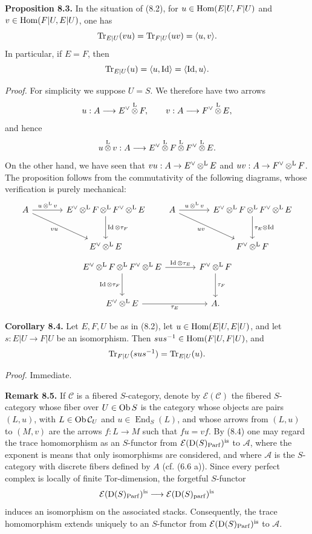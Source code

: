 \documentclass[11pt]{article}
\newcommand{\Parf}{\operatorname{Parf}}
\begin{document}
\textbf{Proposition 8.3.} In the situation of (8.2), for \(u\in\operatorname{Hom}(E|U,F|U)\) and \(v\in\operatorname{Hom}(F|U,E|U)\), one has
\[
  \operatorname{Tr}_{E|U}(vu)=\operatorname{Tr}_{F|U}(uv)=\langle u,v\rangle.
\]
In particular, if \(E=F\), then
\[
  \operatorname{Tr}_{E|U}(u)=\langle u,\operatorname{Id}\rangle=\langle\operatorname{Id},u\rangle.
\]

\emph{Proof.} For simplicity we suppose \(U=S\). We therefore have two arrows
\[
  u:A\longrightarrow E^\vee\mathop{\otimes}^{\mathrm L} F,
  \qquad
  v:A\longrightarrow F^\vee\mathop{\otimes}^{\mathrm L} E,
\]
and hence
\[
  u\mathop{\otimes}^{\mathrm L} v:A\longrightarrow E^\vee\mathop{\otimes}^{\mathrm L} F\mathop{\otimes}^{\mathrm L} F^\vee\mathop{\otimes}^{\mathrm L} E.
\]
On the other hand, we have seen that \(vu:A\to E^\vee\mathop{\otimes}^{\mathrm L} E\) and \(uv:A\to F^\vee\mathop{\otimes}^{\mathrm L} F\). The proposition follows from the commutativity of the following diagrams, whose verification is purely mechanical:
\[
\begin{tikzcd}[column sep=large,row sep=large]
 A \arrow[r,"u\otL v"] \arrow[dr,"vu"'] & E^\vee\otL F\otL F^\vee\otL E \arrow[d,"\Id\otimes\tau_F"] \\
 & E^\vee\otL E
\end{tikzcd}
\qquad
\begin{tikzcd}[column sep=large,row sep=large]
 A \arrow[r,"u\otL v"] \arrow[dr,"uv"'] & E^\vee\otL F\otL F^\vee\otL E \arrow[d,"\tau_E\otimes\Id"] \\
 & F^\vee\otL F
\end{tikzcd}
\]
\[
\begin{tikzcd}[column sep=large,row sep=large]
E^\vee\otL F\otL F^\vee\otL E \arrow[r,"\Id\otimes\tau_E"] \arrow[d,"\Id\otimes\tau_F"'] & F^\vee\otL F \arrow[d,"\tau_F"]\\
E^\vee\otL E \arrow[r,"\tau_E"'] & A .
\end{tikzcd}
\]

\textbf{Corollary 8.4.} Let \(E,F,U\) be as in (8.2), let \(u\in\operatorname{Hom}(E|U,E|U)\), and let \(s:E|U\to F|U\) be an isomorphism. Then \(sus^{-1}\in\operatorname{Hom}(F|U,F|U)\), and
\[
  \operatorname{Tr}_{F|U}(sus^{-1})=\operatorname{Tr}_{E|U}(u).
\]

\emph{Proof.} Immediate.

\textbf{Remark 8.5.} If \(\mathcal C\) is a fibered \(S\)-category, denote by \(\mathcal E(\mathcal C)\) the fibered \(S\)-category whose fiber over \(U\in\operatorname{Ob} S\) is the category whose objects are pairs \((L,u)\), with \(L\in\operatorname{Ob}\mathcal C_U\) and \(u\in\operatorname{End}_S(L)\), and whose arrows from \((L,u)\) to \((M,v)\) are the arrows \(f:L\to M\) such that \(fu=vf\). By (8.4) one may regard the trace homomorphism as an \(S\)-functor from \(\mathcal E(\Dpx(S)_{\Parf})^{\mathrm{is}}\) to \(\mathcal A\), where the exponent \(\mathrm{is}\) means that only isomorphisms are considered, and where \(\mathcal A\) is the \(S\)-category with discrete fibers defined by \(A\) (cf. (6.6 a)). Since every perfect complex is locally of finite Tor-dimension, the forgetful \(S\)-functor
\[
  \mathcal E(\Dpx(S)_{\Parf})^{\mathrm{is}}
  \longrightarrow
  \mathcal E(\Dpx(S)_{\parf})^{\mathrm{is}}
\]
induces an isomorphism on the associated stacks. Consequently, the trace homomorphism extends uniquely to an \(S\)-functor from \(\mathcal E(\Dpx(S)_{\Parf})^{\mathrm{is}}\) to \(\mathcal A\).
\end{document}
